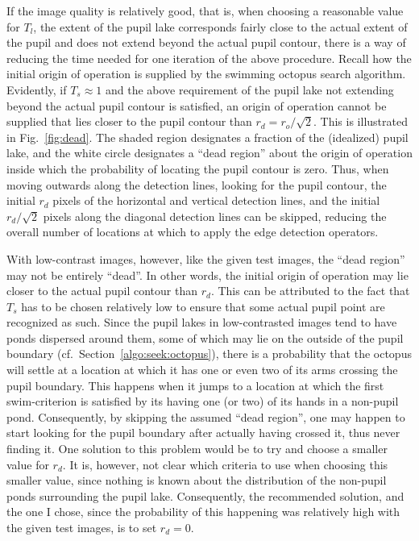 If the image quality is relatively good, that is, when choosing a
reasonable value for $T_{l}$, the extent of the pupil lake corresponds
fairly close to the actual extent of the pupil and does not extend
beyond the actual pupil contour, there is a way of reducing the time
needed for one iteration of the above procedure.  Recall how the
initial origin of operation is supplied by the swimming octopus search
algorithm.  Evidently, if $T_{s}\approx 1$ and the above requirement
of the pupil lake not extending beyond the actual pupil contour is
satisfied, an origin of operation cannot be supplied that lies closer
to the pupil contour than $r_{d}=r_{o}/\sqrt{2}$.  This is illustrated
in Fig.~\ref{fig:dead}.  The shaded region designates a fraction of
the (idealized) pupil lake, and the white circle designates a ``dead
region'' about the origin of operation inside which the probability of
locating the pupil contour is zero.  Thus, when moving outwards along
the detection lines, looking for the pupil contour, the initial
$r_{d}$ pixels of the horizontal and vertical detection lines, and the
initial $r_{d}/\sqrt{2}$ pixels along the diagonal detection lines can
be skipped, reducing the overall number of locations at which to apply
the edge detection operators.

With low-contrast images, however, like the given test images, the
``dead region'' may not be entirely ``dead''.  In other words, the
initial origin of operation may lie closer to the actual pupil contour
than $r_{d}$.  This can be attributed to the fact that $T_{s}$ has to
be chosen relatively low to ensure that some actual pupil point are
recognized as such.  Since the pupil lakes in low-contrasted images
tend to have ponds dispersed around them, some of which may lie on the
outside of the pupil boundary (cf.\ Section~\ref{algo:seek:octopus}),
there is a probability that the octopus will settle at a location at
which it has one or even two of its arms crossing the pupil boundary.
This happens when it jumps to a location at which the first
swim-criterion is satisfied by its having one (or two) of its hands in
a non-pupil pond.  Consequently, by skipping the assumed ``dead
region'', one may happen to start looking for the pupil boundary after
actually having crossed it, thus never finding it.  One solution to
this problem would be to try and choose a smaller value for $r_{d}$.
It is, however, not clear which criteria to use when choosing this
smaller value, since nothing is known about the distribution of the
non-pupil ponds surrounding the pupil lake.  Consequently, the
recommended solution, and the one I chose, since the probability of
this happening was relatively high with the given test images, is to
set $r_{d}=0$.

